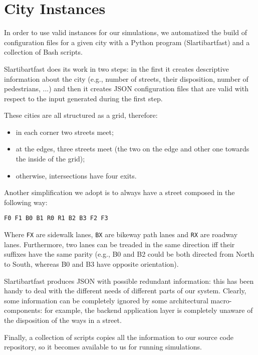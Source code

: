 \section{City Instances}

In order to use valid instances for our simulations, we automatized the build
of configuration files for a given city with a Python program (Slartibartfast)
and a collection of Bash scripts.

Slartibartfast does its work in two steps: in the first it creates
descriptive information about the city (e.g., number of streets, their
disposition, number of pedestrians, ...) and then it creates JSON configuration
files that are valid with respect to the input generated during the first step.

These cities are all structured as a grid, therefore:

\begin{itemize}
    \item in each corner two streets meet;
    \item at the edges, three streets meet (the two on the edge and other one
        towards the inside of the grid);
    \item otherwise, intersections have four exits.
\end{itemize}

Another simplification we adopt is to always have a street composed in the
following way:


\begin{verbatim}
F0 F1 B0 B1 R0 R1 B2 B3 F2 F3
\end{verbatim}

Where \texttt{FX} are sidewalk lanes, \texttt{BX} are bikeway path lanes and
\texttt{RX} are roadway lanes. Furthermore, two lanes can be treaded in the
same direction iff their suffixes have the same parity (e.g., B0 and B2
could be both directed from North to South, whereas B0 and B3 have opposite
orientation).

Slartibartfast produces JSON with possible redundant information: this has
been handy to deal with the different needs of different parts of our system.
Clearly, some information can be completely ignored by some architectural
macro-components: for example, the backend application layer is completely
unaware of the disposition of the ways in a street.

Finally, a collection of scripts copies all the information to our source code
repository, so it becomes available to us for running simulations.

